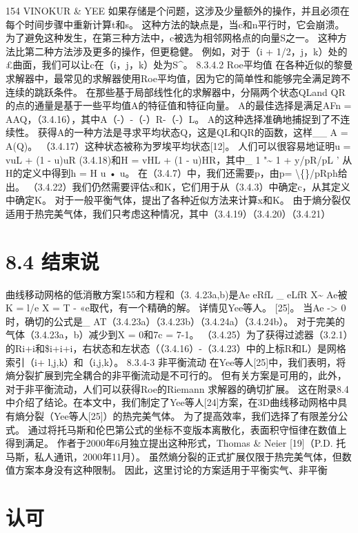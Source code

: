 \documentclass[UTF8,11pt,a4paper,openany,fontset=fandol]{ctexbook}
\begin{document}
154 VINOKUR \& YEE 如果存储是个问题，这涉及少量额外的操作，并且必须在每个时间步骤中重新计算t和s。 这种方法的缺点是，当c和n平行时，它会崩溃。 为了避免这种发生，在第三种方法中，c被选为相邻网格点的向量S之一。 这种方法比第二种方法涉及更多的操作，但更稳健。 例如，对于（i + 1/2，j，k）处的£曲面，我们可以让c在（i，j，k）处为S\textasciicircum{}。 8.3.4.2 Roe平均值 在各种近似的黎曼求解器中，最常见的求解器使用Roe平均值，因为它的简单性和能够完全满足跨不连续的跳跃条件。 在那些基于局部线性化的求解器中，分隔两个状态QLand QR的点的通量是基于一些平均值A的特征值和特征向量。 A的最佳选择是满足AFn = AAQ，（3.4.16），其中A（-）-（-）R-（-）L。 A的这种选择准确地捕捉到了不连续性。 获得A的一种方法是寻求平均状态Q，这是QL和QR的函数，这样\_\_ A = A(Q)。 （3.4.17）这种状态被称为罗埃平均状态[12]。 人们可以很容易地证明u = vuL + (1 - u)uR (3.4.18)和H = vHL + (1 - u)HR，其中\_ 1 "\textasciitilde{} 1 + y/pR/pL ' 从H的定义中得到h = H u • u。 在（3.4.7）中，我们还需要p，由p= \textbackslash\{\}/pRph给出。 （3.4.22）我们仍然需要评估x和K，它们用于从（3.4.3）中确定c，从其定义中确定K。 对于一般平衡气体，提出了各种近似方法来计算x和K。 由于熵分裂仅适用于热完美气体，我们只考虑这种情况，其中（3.4.19）（3.4.20）（3.4.21）

\section{8.4 结束说}
曲线移动网格的低消散方案155和方程和（3. 4.23a,b)是Ae eRfL \_ eLfR X\textasciitilde{} Ae被K = l/e X = T - «e取代，有一个精确的解。 详情见Yee等人。 [25]。 当Ae -> 0时，确切的公式是\_ AT（3.4.23a）（3.4.23b）（3.4.24a）（3.4.24b）。 对于完美的气体（3.4.23a，b）减少到X = 0和7c = 7-1。 （3.4.25）为了获得过滤器（3.2.1）的Ri+i和\$i+i+i，右状态和左状态（（3.4.16）-（3.4.23）中的上标R和L）是网格索引（i+ l,j,k）和（i,j,k）。 8.3.4-3 非平衡流动 在Yee等人[25]中，我们表明，将熵分裂扩展到完全耦合的非平衡流动是不可行的。 但有关方案是可用的，此外，对于非平衡流动，人们可以获得Roe的Riemann 求解器的确切扩展。 这在附录8.4中介绍了结论。在本文中，我们制定了Yee等人[24]方案，在3D曲线移动网格中具有熵分裂（Yee等人[25]）的热完美气体。 为了提高效率，我们选择了有限差分公式。 通过将托马斯和伦巴第公式的坐标不变版本离散化，表面积守恒律在数值上得到满足。 作者于2000年6月独立提出这种形式，Thomas \& Neier [19]（P.D. 托马斯，私人通讯，2000年11月）。 虽然熵分裂的正式扩展仅限于热完美气体，但数值方案本身没有这种限制。 因此，这里讨论的方案适用于平衡实气、非平衡

\section{认可}
\end{document}
